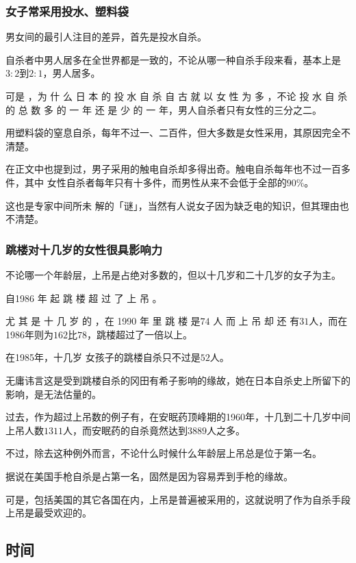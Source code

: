 \documentclass[UTF8]{ctexart}
\begin{document}
\subsubsection*{女子常采用投水、塑料袋}

男女间的最引人注目的差异，首先是投水自杀。

自杀者中男人居多在全世界都是一致的，不论从哪一种自杀手段来看，基本上是$3:2$到$2:1$，男人居多。

可是 ，为 什 么 日 本 的 投 水 自 杀 自 古 就 以 女 性 为 多 ，不论 投 水 自 杀 的 总 数 多 的 一 年 还 是 少 的 一 年，男人自杀者只有女性的三分之二。

用塑料袋的窒息自杀，每年不过一、二百件，但大多数是女性采用，其原因完全不清楚。

在正文中也提到过，男子采用的触电自杀却多得出奇。触电自杀每年也不过一百多件，其中 女性自杀者每年只有十多件，而男性从来不会低于全部的$90\%$。

这也是专家中间所未 解的「谜」，当然有人说女子因为缺乏电的知识，但其理由也不清楚。

\subsubsection*{跳楼对十几岁的女性很具影响力}

不论哪一个年龄层，上吊是占绝对多数的，但以十几岁和二十几岁的女子为主。

自1986 年 起 跳 楼 超 过 了 上 吊 。

尤 其 是 十 几 岁 的 ，在 1990 年 里 跳 楼 是$74$ 人 而 上 吊 却 还 有$31$人，而在1986年则为$162$比$78$，跳楼超过了一倍以上。

在1985年，十几岁 女孩子的跳楼自杀只不过是$52$人。

无庸讳言这是受到跳楼自杀的冈田有希子影响的缘故，她在日本自杀史上所留下的影响，是无法估量的。

过去，作为超过上吊数的例子有，在安眠药顶峰期的1960年，十几到二十几岁中间上吊人数$1311$人，而安眠药的自杀竟然达到$3889$人之多。

不过，除去这种例外而言，不论什么时候什么年龄层上吊总是位于第一名。

据说在美国手枪自杀是占第一名，固然是因为容易弄到手枪的缘故。

可是，包括美国的其它各国在内，上吊是普遍被采用的，这就说明了作为自杀手段上吊是最受欢迎的。

\subsection{时间}
\end{document}
